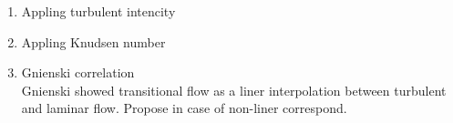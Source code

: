 \documentclass[conference]{IEEEtran}
\begin{document}
\begin{enumerate}
  \item Appling turbulent intencity\\
  \item Appling Knudsen number\\
  \item Gnienski correlation\\
  Gnienski showed transitional flow as a liner interpolation between turbulent and laminar flow.
  Propose in case of non-liner correspond.
\end{enumerate}
\end{document}
